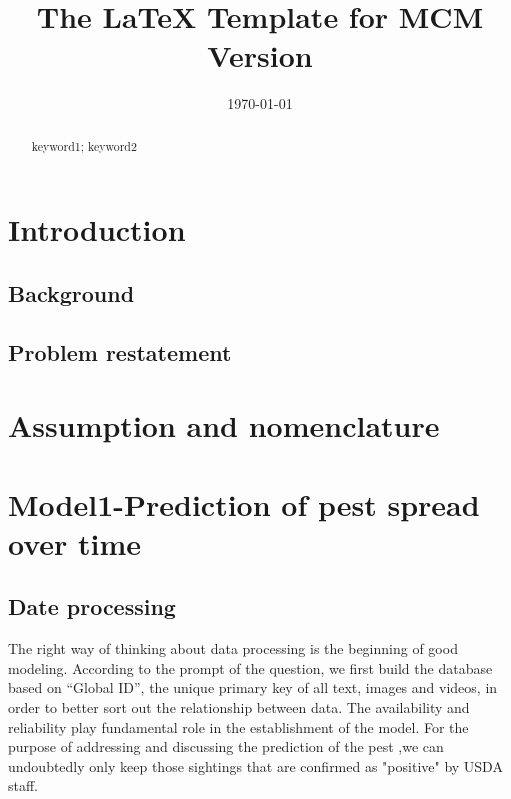 \documentclass{mcmthesis}
\title{The \LaTeX{} Template for MCM Version \MCMversion}  %
\date{\today}
\begin{document}
\begin{abstract}
\begin{keywords}  
keyword1; keyword2
\end{keywords}
\end{abstract}
 
\maketitle         %
\tableofcontents   %
\newpage
 
 
\section{Introduction}
\subsection{Background}
\subsection{Problem restatement}
\section{Assumption and nomenclature}
\section{Model1-Prediction of pest spread over time}
\subsection{Date processing}
The right way of thinking about data processing is the beginning of good modeling. According to the prompt of the question, we first build the database based on “Global ID”, the unique primary key of all text, images and videos, in order to better sort out the relationship between data. The availability and reliability play fundamental role in the establishment of the model. For the purpose of addressing and discussing the prediction of the pest ,we can undoubtedly only keep those sightings that are confirmed as "positive" by USDA staff.
\end{document}
